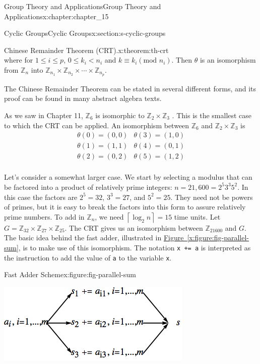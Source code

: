 \documentclass[oneside,10pt,]{book}
\newcommand{\xreffont}{\relax}
\newcommand{\mono}[1]{\texttt{#1}}
\numberwithin{equation}{section}
\begin{document}
\begin{chapterptx}{Group Theory and Applications}{}{Group Theory and Applications}{}{}{x:chapter:chapter_15}
\begin{sectionptx}{Cyclic Groups}{}{Cyclic Groups}{}{}{x:section:s-cyclic-groups}
\begin{theorem}{Chinese Remainder Theorem (CRT).}{}{x:theorem:th-crt}
\begin{equation*}
\end{equation*}
where for \(1\leq i\leq p\),   \(0\leq k_i < n_i\)   and  \(k\equiv k_i\left(\textrm{mod } n_i\right)\).  Then \(\theta\) is an isomorphism from \(\mathbb{Z}_n\) into \(\mathbb{Z}_{n_1}\times \mathbb{Z}_{n_2}\times  \cdots \times \mathbb{Z}_{n_p}\).%
\end{theorem}
The Chinese Remainder Theorem can be stated in several different forms, and its proof can be found in many abstract algebra texts.%
\par
As we saw in Chapter 11, \(\mathbb{Z}_6\) is isomorphic to \(\mathbb{Z}_2 \times  \mathbb{Z}_3\) . This is the smallest case to which the CRT can be applied. An isomorphism between \(\mathbb{Z}_6\) and \(\mathbb{Z}_2 \times  \mathbb{Z}_3\) is%
\begin{equation*}
\begin{array}{cc}
\theta(0) = (0,0) & \theta(3) = (1,0)\\
\theta(1) = (1, 1) & \theta(4) = (0, 1)\\ 
\theta(2) = (0, 2) & \theta(5) = (1,2)\\
\end{array}
\end{equation*}
%
\par
Let's consider a somewhat larger case.  We start by selecting a modulus that can be factored into a product of relatively prime integers: \(n=21,600=2^5 3^3 5^2\).  In this case the factors are \(2^5=32\), \(3^3=27\), and \(5^2=25\).  They need not be powers of primes, but it is easy to break the factors into this form to assure relatively prime numbers.  To add in \(\mathbb{Z}_n\), we need \(\left\lceil \log _2n\right\rceil =15\) time units.  Let \(G=\mathbb{Z}_{32}\times \mathbb{Z}_{27}\times \mathbb{Z}_{25}\).   The CRT gives us an isomorphism between \(\mathbb{Z}_{21600}\) and \(G\). The basic idea behind the fast adder, illustrated in \hyperref[x:figure:fig-parallel-sum]{Figure~{\xreffont\ref{x:figure:fig-parallel-sum}}}, is to make use of this isomorphism. The notation \mono{x += a} is interpreted as the instruction to add the value of \mono{a} to the variable \mono{x}.%
\begin{figureptx}{Fast Adder Scheme}{x:figure:fig-parallel-sum}{}%
\begin{image}{0.15}{0.7}{0.15}%
\includegraphics[width=\linewidth]{images/fig-parallel-sum.png}

\end{image}
\end{figureptx}
\end{sectionptx}
\end{chapterptx}
\end{document}
